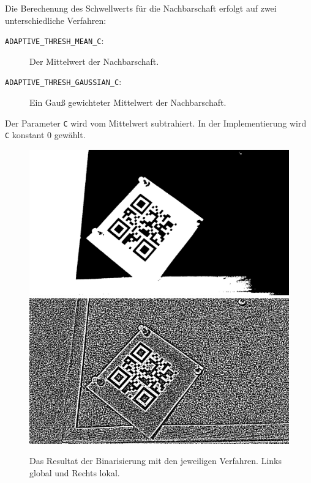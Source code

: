 Die Berechenung des Schwellwerts für die Nachbarschaft erfolgt auf zwei unterschiedliche Verfahren:
\begin{description}
	\item[\texttt{ADAPTIVE\_THRESH\_MEAN\_C}:] Der Mittelwert der Nachbarschaft.
	\item[\texttt{ADAPTIVE\_THRESH\_GAUSSIAN\_C}:] Ein Gauß gewichteter Mittelwert der Nachbarschaft.
\end{description}

Der Parameter \texttt{C} wird vom Mittelwert subtrahiert. In der Implementierung wird \texttt{C} konstant $0$ gewählt.

\begin{figure}[h]
\center
\includegraphics[scale=0.12]{images/qrcode-adler-wand_1___BINARIZED___.jpg}
\hspace{5px}
\includegraphics[scale=0.12]{images/qrcode-adler-wand_2___BINARIZED___.jpg}
\caption{Das Resultat der Binarisierung mit den jeweiligen Verfahren. Links global und Rechts lokal.}
\end{figure}